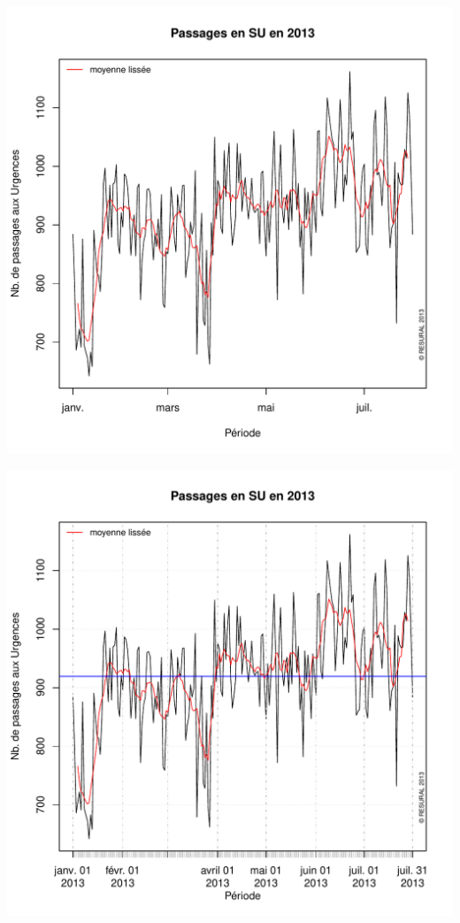 \documentclass[12pt,english,french,twoside]{report}\usepackage[]{graphicx}\usepackage[]{color}
\makeatletter
\def\maxwidth{ %
  \ifdim\Gin@nat@width>\linewidth
    \linewidth
  \else
    \Gin@nat@width
  \fi
}
\newenvironment{knitrout}{}{} %
\makeatother
\begin{document}
\begin{knitrout}
\color{fgcolor}
\includegraphics[width=\maxwidth]{figure/activite_plot} 

\end{knitrout}

\begin{knitrout}
\color{fgcolor}
\includegraphics[width=\maxwidth]{figure/activite_plot2} 

\end{knitrout}
\end{document}

